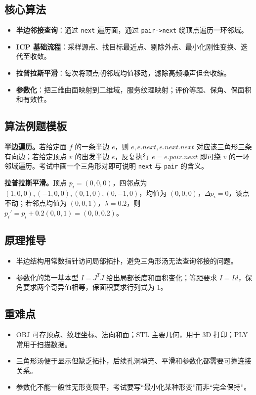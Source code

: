 \documentclass[UTF8,zihao=-4,scheme=chinese,fontset=fandol]{ctexart}
\newcommand{\key}[1]{\textbf{#1}}
\begin{document}
\subsection{核心算法}
\begin{itemize}
  \item \key{半边邻接查询}：通过 \texttt{next} 遍历面，通过 \texttt{pair->next} 绕顶点遍历一环邻域。
  \item \key{ICP 基础流程}：采样源点、找目标最近点、剔除外点、最小化刚性变换、迭代至收敛。
  \item \key{拉普拉斯平滑}：每次将顶点朝邻域均值移动，滤除高频噪声但会收缩。
  \item \key{参数化}：把三维曲面映射到二维域，服务纹理映射；评价等距、保角、保面积和有效性。
\end{itemize}

\subsection{算法例题模板}
\textbf{半边遍历。}若给定面 $f$ 的一条半边 $e$，则 $e,e.next,e.next.next$ 对应该三角形三条有向边；若给定顶点 $v$ 的出发半边 $e$，反复执行 $e=e.pair.next$ 即可绕 $v$ 的一环邻域遍历。考试中画一个三角形对即可说明 \texttt{next} 与 \texttt{pair} 的含义。

\textbf{拉普拉斯平滑。}顶点 $p_i=(0,0,0)$，四邻点为 $(1,0,0),(-1,0,0),(0,1,0),(0,-1,0)$，均值为 $(0,0,0)$，$\Delta p_i=0$，该点不动；若邻点均值为 $(0,0,1)$，$\lambda=0.2$，则 $p_i'=p_i+0.2(0,0,1)=(0,0,0.2)$。

\subsection{原理推导}
\begin{itemize}
  \item 半边结构用常数指针访问局部拓扑，避免三角形汤无法查询邻接的问题。
  \item 参数化的第一基本型 $I=J^TJ$ 给出局部长度和面积变化；等距要求 $I=Id$，保角要求两个奇异值相等，保面积要求行列式为 $1$。
\end{itemize}

\subsection{重难点}
\begin{itemize}
  \item OBJ 可存顶点、纹理坐标、法向和面；STL 主要几何，用于 3D 打印；PLY 常用于扫描数据。
  \item 三角形汤便于显示但缺乏拓扑，后续孔洞填充、平滑和参数化都需要可靠连接关系。
  \item 参数化不能一般性无形变展平，考试要写“最小化某种形变”而非“完全保持”。
\end{itemize}
\end{document}
